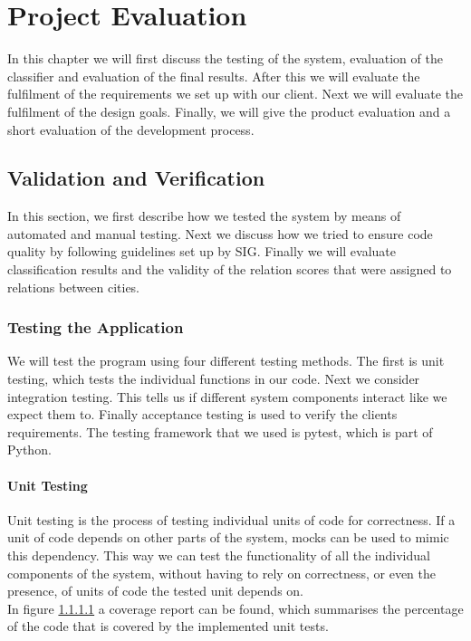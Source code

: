 \chapter{Project Evaluation}\label{sec:project-evaluation}
In this chapter we will first discuss the testing of the system, evaluation of the classifier and evaluation of the final results. After this we will evaluate the fulfilment of the requirements we set up with our client. Next we will evaluate the fulfilment of the design goals. Finally, we will give the product evaluation and a short evaluation of the development process.

\section{Validation and Verification}
In this section, we first describe how we tested the system by means of automated and manual testing. Next we discuss how we tried to ensure code quality by following guidelines set up by SIG\cite{sig}. Finally we will evaluate classification results and the validity of the relation scores that were assigned to relations between cities.

\subsection{Testing the Application}
We will test the program using four different testing methods. The first is unit testing, which tests the individual functions in our code. Next we consider integration testing. This tells us if different system components interact like we expect them to. Finally acceptance testing is used to verify the clients requirements. The testing framework that we used is pytest\cite{pytest}, which is part of Python.

\subsubsection{Unit Testing}
Unit testing is the process of testing individual units of code for correctness. If a unit of code depends on other parts of the system, mocks can be used to mimic this dependency. This way we can test the functionality of all the individual components of the system, without having to rely on correctness, or even the presence, of units of code the tested unit depends on.\\
In figure \ref{} a coverage report can be found, which summarises the percentage of the code that is covered by the implemented unit tests.


